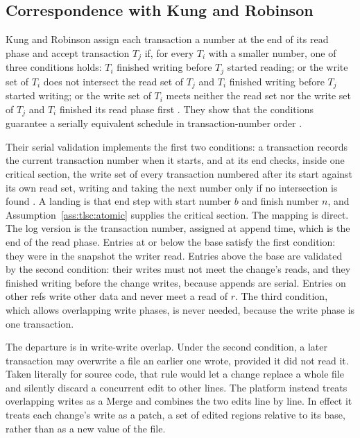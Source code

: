 \documentclass[11pt,letterpaper]{article}
\theoremstyle{definition}
\theoremstyle{remark}
\begin{document}
\subsection{Correspondence with Kung and Robinson}

Kung and Robinson assign each transaction a number at the end of its read phase and accept transaction $T_j$ if, for every $T_i$ with a smaller number, one of three conditions holds: $T_i$ finished writing before $T_j$ started reading; or the write set of $T_i$ does not intersect the read set of $T_j$ and $T_i$ finished writing before $T_j$ started writing; or the write set of $T_i$ meets neither the read set nor the write set of $T_j$ and $T_i$ finished its read phase first \cite{kung1981occ}. They show that the conditions guarantee a serially equivalent schedule in transaction-number order \cite{kung1981occ}.

Their serial validation implements the first two conditions: a transaction records the current transaction number when it starts, and at its end checks, inside one critical section, the write set of every transaction numbered after its start against its own read set, writing and taking the next number only if no intersection is found \cite[Section 4]{kung1981occ}. A landing is that end step with start number $b$ and finish number $n$, and Assumption~\ref{ass:tlsc:atomic} supplies the critical section. The mapping is direct. The log version is the transaction number, assigned at append time, which is the end of the read phase. Entries at or below the base satisfy the first condition: they were in the snapshot the writer read. Entries above the base are validated by the second condition: their writes must not meet the change's reads, and they finished writing before the change writes, because appends are serial. Entries on other refs write other data and never meet a read of $r$. The third condition, which allows overlapping write phases, is never needed, because the write phase is one transaction.

The departure is in write-write overlap. Under the second condition, a later transaction may overwrite a file an earlier one wrote, provided it did not read it. Taken literally for source code, that rule would let a change replace a whole file and silently discard a concurrent edit to other lines. The platform instead treats overlapping writes as a Merge and combines the two edits line by line. In effect it treats each change's write as a patch, a set of edited regions relative to its base, rather than as a new value of the file.
\end{document}
